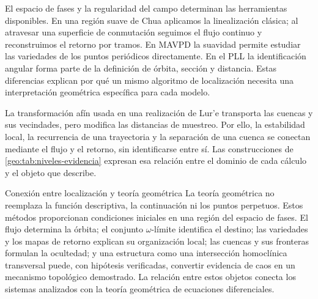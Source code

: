 El espacio de fases y la regularidad del campo determinan las herramientas
disponibles. En una región suave de Chua aplicamos la linealización clásica;
al atravesar una superficie de conmutación seguimos el flujo continuo y
reconstruimos el retorno por tramos. En MAVPD la suavidad permite estudiar
las variedades de los puntos periódicos directamente. En el PLL la
identificación angular forma parte de la definición de órbita, sección y
distancia. Estas diferencias explican por qué un mismo algoritmo de
localización necesita una interpretación geométrica específica para cada
modelo.

La transformación afín usada en una realización de Lur'e transporta las
cuencas y sus vecindades, pero modifica las distancias de muestreo. Por ello,
la estabilidad local, la recurrencia de una trayectoria y la separación de
una cuenca se conectan mediante el flujo y el retorno, sin identificarse
entre sí. Las construcciones de \cref{geo:tab:niveles-evidencia} expresan
esa relación entre el dominio de cada cálculo y el objeto que describe.

\begin{hallazgo}{Conexión entre localización y teoría geométrica}
La teoría geométrica no reemplaza la función descriptiva, la continuación ni
los puntos perpetuos. Estos métodos proporcionan condiciones iniciales en una
región del espacio de fases. El flujo determina la órbita; el conjunto
\(\omega\)-límite identifica el destino; las variedades y los mapas de retorno
explican su organización local; las cuencas y sus fronteras formulan la
ocultedad; y una estructura como una intersección homoclínica transversal
puede, con hipótesis verificadas, convertir evidencia de caos en un mecanismo
topológico demostrado. La relación entre estos objetos conecta los sistemas
analizados con la teoría geométrica de ecuaciones diferenciales.
\end{hallazgo}
\fi
\fi
